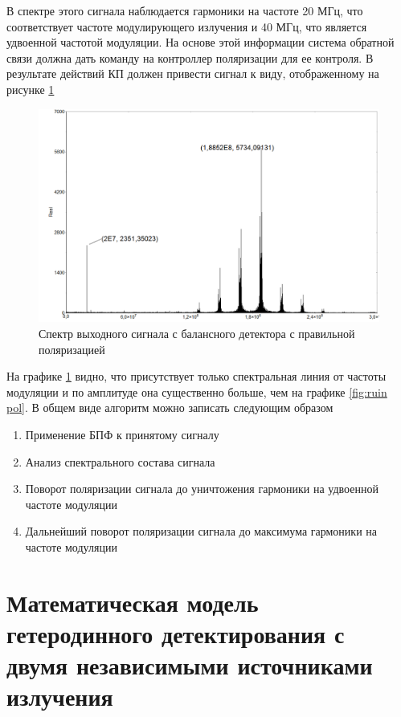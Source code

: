 В спектре этого сигнала наблюдается гармоники на частоте 20 МГц, что соответствует частоте модулирующего излучения и 40 МГц, что является удвоенной частотой модуляции. На основе этой информации система обратной связи должна дать команду на контроллер поляризации для ее контроля. В результате действий КП должен привести сигнал к виду, отображенному на рисунке \ref{fig:norm pol}
\begin{figure}
    \centering
    \includegraphics[width = \linewidth]{images/normal polarization.png}
    \caption{Спектр выходного сигнала с балансного детектора с правильной поляризацией}
    \label{fig:norm pol}
\end{figure}
На графике \ref{fig:norm pol} видно, что присутствует только спектральная линия от частоты модуляции и по амплитуде она существенно больше, чем на графике \ref{fig:ruin pol}. 
В общем виде алгоритм можно записать следующим образом
\begin{enumerate}
    \item Применение БПФ к принятому сигналу
    \item Анализ спектрального состава сигнала
    \item Поворот поляризации сигнала до уничтожения гармоники на удвоенной частоте модуляции
    \item Дальнейший поворот поляризации сигнала до максимума гармоники на частоте модуляции
\end{enumerate}
\section{Математическая модель гетеродинного детектирования с двумя независимыми источниками излучения}\label{sec:ch3/sect6}
